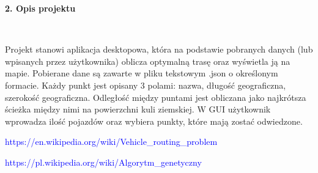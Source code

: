 \documentclass[a4paper, twoside, 12pt]{article}
\begin{document}
	\newpage
	\begin{large}\textbf{2. Opis projektu}\end{large}\\
	\vspace{10mm} %
	
	\hspace{5mm}Projekt stanowi aplikacja desktopowa, która na podstawie pobranych danych (lub wpisanych przez użytkownika) oblicza optymalną trasę oraz wyświetla ją na mapie. Pobierane dane są zawarte w pliku tekstowym .json o określonym formacie. Każdy punkt jest opisany 3 polami: nazwa, długość geograficzna, szerokość geograficzna. Odległość między puntami jest obliczana jako najkrótsza ścieżka między nimi na powierzchni kuli ziemskiej. W GUI użytkownik wprowadza ilość pojazdów oraz wybiera punkty, które mają zostać odwiedzone.
	
	
	
	\newpage
	\renewcommand\refname{Źródła}
	\begin{thebibliography}{}
		{\hypertarget{vrp}{\textcolor{blue}{https://en.wikipedia.org/wiki/Vehicle\_routing\_problem}}}
		
		{\hypertarget{ag}{\textcolor{blue}{https://pl.wikipedia.org/wiki/Algorytm\_genetyczny}}}
		
	\end{thebibliography}
	
	
	
\end{document}
